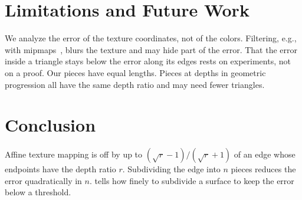 \section{Limitations and Future Work}\label{sec:Limitations}
We analyze the error of the texture coordinates, not of the colors.
Filtering, e.g., with mipmaps~\cite{Williams83PP}, blurs the texture and may hide part of the error.
That the error inside a triangle stays below the error along its edges rests on experiments, not on a proof.
Our pieces have equal lengths.
Pieces at depths in geometric progression all have the same depth ratio and may need fewer triangles.

\section{Conclusion}\label{sec:Conclusion}
Affine texture mapping is off by up to $(\sqrt{r} - 1)/(\sqrt{r} + 1)$ of an edge whose endpoints have the depth ratio $r$.
Subdividing the edge into $n$ pieces reduces the error quadratically in $n$.
 tells how finely to subdivide a surface to keep the error below a threshold.
